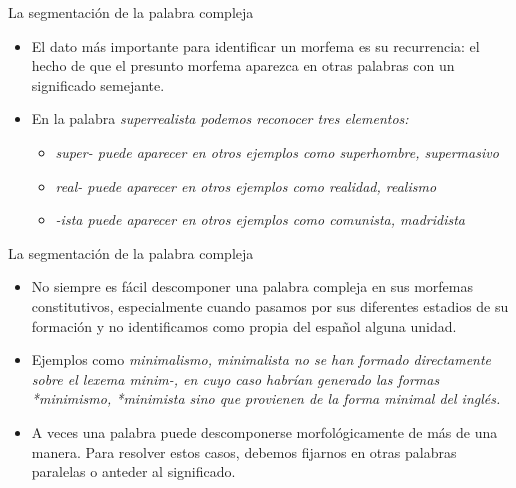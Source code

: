 \documentclass{beamer}
\begin{document}
\begin{frame}{La segmentación de la palabra compleja}

\begin{itemize}
	\item El dato más importante para identificar un morfema es su recurrencia: el hecho de que el presunto morfema aparezca en otras palabras con un significado semejante. 
	\item En la palabra \it{superrealista} podemos reconocer tres elementos: 
	\begin{itemize}
		\item \it{super-} puede aparecer en otros ejemplos como \it{superhombre, supermasivo}
		\item \it{real-} puede aparecer en otros ejemplos como \it{realidad, realismo}
		\item \it{-ista} puede aparecer en otros ejemplos como \it{comunista, madridista}
	\end{itemize}
\end{itemize}

\end{frame}

\begin{frame}{La segmentación de la palabra compleja}
	
\begin{itemize}
	\item No siempre es fácil descomponer una palabra compleja en sus morfemas constitutivos, especialmente cuando pasamos por sus diferentes estadios de su formación y no identificamos como propia del español alguna unidad.
	\item Ejemplos como \it{minimalismo, minimalista} no se han formado directamente sobre el lexema \it{minim-}, en cuyo caso habrían generado las formas \it{*minimismo, *minimista} sino que provienen de la forma \it{minimal} del inglés.
	\item A veces una palabra puede descomponerse morfológicamente de más de una manera. Para resolver estos casos, debemos fijarnos en otras palabras paralelas o anteder al significado.
\end{itemize}
\end{frame}
\end{document}
